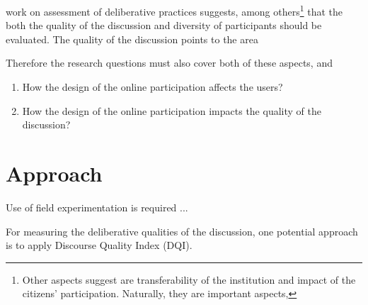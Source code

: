 \documentclass[journal,a4paper]{IEEEtran}
\begin{document}
 work on assessment of deliberative practices suggests, among others\footnote{Other aspects  suggest are transferability of the institution and impact of the citizens' participation. Naturally, they are important aspects,} that the both the quality of the discussion and diversity of participants should be evaluated. The quality of the discussion points to the area

Therefore the research questions must also cover both of these aspects, and 

\begin{enumerate}
\item How the design of the online participation affects the users?
\item How the design of the online participation impacts the quality of the discussion?
\end{enumerate}

\section{Approach}

Use of field experimentation is required ...

For measuring the deliberative qualities of the discussion, one potential approach is to apply  Discourse Quality Index (DQI).



\end{document}
